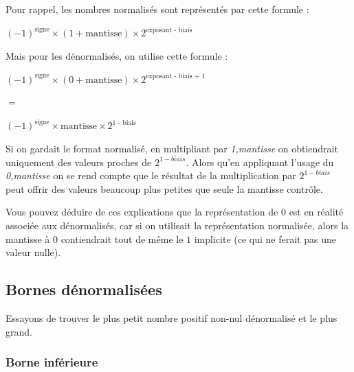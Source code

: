 \documentclass[11pt,a4paper]{article}
\begin{document}
\bigskip


Pour rappel, les nombres normalisés sont représentés par cette formule :
\begin{center}
$ (-1)^{\text{signe}} \times (1 + \text{mantisse}) \times 2^{\text{exposant - biais}} $
\end{center}

\medskip

Mais pour les dénormalisés, on utilise cette formule :
\begin{center}
$ (-1)^{\text{signe}} \times (0 + \text{mantisse}) \times 2^{\text{exposant - biais + 1}} $

\smallskip
$ = $
\smallskip

$ (-1)^{\text{signe}} \times \text{mantisse} \times 2^{\text{1 - biais}} $
\end{center}

Si on gardait le format normalisé, en multipliant par \og \textit{1,mantisse} \fg{} on obtiendrait uniquement des valeurs proches de $ 2^{1 - biais} $.
Alors qu'en appliquant l'usage du \og \textit{0,mantisse} \fg{} on se rend compte que le résultat de la multiplication par $ 2^{1 - biais} $ peut offrir des valeurs beaucoup plus petites que seule la mantisse contrôle.

\medskip

Vous pouvez déduire de ces explications que la représentation de $ 0 $ est en réalité associée aux dénormalisés, car si on utilisait la représentation normalisée, alors la mantisse à $ 0 $ contiendrait tout de même le $ 1 $ implicite (ce qui ne ferait pas une valeur nulle).



\clearpage


\subsection{Bornes dénormalisées}

\medskip

Essayons de trouver le plus petit nombre positif non-nul dénormalisé et le plus grand.

\bigskip

\subsubsection{Borne inférieure}
\end{document}
